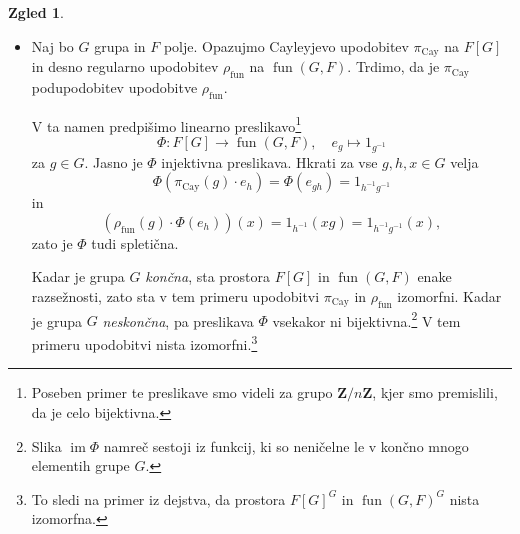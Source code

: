 \documentclass[11pt]{book}
\def\ZZ{\mathbf{Z}}
\def\11{\mathbf{1}}
\DeclareMathOperator\image{im}
\DeclareMathOperator\fun{fun}
\DeclareMathOperator\Cay{Cay}
\theoremstyle{definition}
\theoremstyle{zgled}
\newtheorem*{zgled}{Zgled}
\theoremstyle{odprtproblem}
\theoremstyle{domacanaloga}
\theoremstyle{izrek}
\begin{document}
\begin{zgled}
\begin{itemize}
    Torej za vsak $g \in G$ obstaja $\chi(g) \in F$, da je $\rho(g) \cdot v = \chi(g) v$. Na ta način dobimo funkcijo $\chi \colon G \to F$, se pravi element prostora $\fun(G,F)$. Ta funkcija ni čisto poljubna; ker je $\rho$ upodobitev, je $\chi$ nujno {\em homomorfizem} iz grupe $G$ v grupo $F^*$. Torej je $\chi$ pravzaprav upodobitev grupe $G$ na prostoru $F$ razsežnosti $1$.\footnote{Kadar je $\chi(g) = 1$ za vsak $g \in G$, je ta upodobitev izomorfna $\11$. Kadar je $\chi(g) \neq 1$ za vsaj kak $g \in G$, pa ta upodobitev \emph{ni} trivialna.} 
    
    Zdaj kot v zadnjem zgledu s predpisom
    \[
        \Phi \colon F \to V, \quad
        x \mapsto xv
    \]
    dobimo injektivno spletično med $\chi$ in $\rho$, torej lahko vidimo $\chi$ kot enorazsežno podupodobitev upodobitve $\rho$. Hkrati lahko iz te spletične obnovimo podatek o skupnem lastnem vektorju $v$ in upodobitvi $\chi$.\footnote{Namreč, $v = \Phi(1)$ in $\chi(g) = \rho(g) \cdot 1$.} 
    
    Torej smo vzpostavili bijektivno korespondenco med množico enorazsežnih podupodobitev upodobitve $\rho$ in skupnimi lastnimi vektorji vseh preslikav $\rho(g)$ za $g \in G$.

    Poseben primer te korespondence je zadnji zgled. Množico enorazsežnih trivialnih podupodobitev upodobitve $\rho$ lahko identificiramo z množico neničelnih spletičen $\hom_G(\11, V) \backslash \{ x \mapsto 0 \}$, ta pa ustreza skupnim lastnim vektorjem $\rho(g)$ za $g \in G$ z lastno vrednostjo $1$, kar je ravno množica $V^G \backslash \{ 0 \}$.

    \item Naj bo $G$ grupa in $F$ polje. Opazujmo Cayleyjevo upodobitev $\pi_{\Cay}$ na $F[G]$ in desno regularno upodobitev $\rho_{\fun}$ na $\fun(G,F)$. Trdimo, da je $\pi_{\Cay}$ podupodobitev upodobitve $\rho_{\fun}$.
    
    V ta namen predpišimo linearno preslikavo\footnote{Poseben primer te preslikave smo videli za grupo $\ZZ/n\ZZ$, kjer smo premislili, da je celo bijektivna.}
    \[
        \Phi \colon F[G] \to \fun(G,F), \quad
        e_g \mapsto 1_{g^{-1}}
    \]
    za $g \in G$. Jasno je $\Phi$ injektivna preslikava. Hkrati za vse $g,h,x \in G$ velja
    \[
        \Phi(\pi_{\Cay}(g) \cdot e_h) 
        = \Phi(e_{gh})
        = 1_{h^{-1} g^{-1}}
    \]
    in
    \[
        \left( \rho_{\fun}(g) \cdot \Phi(e_h) \right)(x)
        = 1_{h^{-1}}(xg)
        = 1_{h^{-1} g^{-1}}(x),
    \]
    zato je $\Phi$ tudi spletična.

    Kadar je grupa $G$ \emph{končna}, sta prostora $F[G]$ in $\fun(G,F)$ enake razsežnosti, zato sta v tem primeru upodobitvi $\pi_{\Cay}$ in $\rho_{\fun}$ izomorfni. Kadar je grupa $G$ \emph{neskončna}, pa preslikava $\Phi$ vsekakor ni bijektivna.\footnote{Slika $\image \Phi$ namreč sestoji iz funkcij, ki so neničelne le v končno mnogo elementih grupe $G$.} V tem primeru upodobitvi nista izomorfni.\footnote{To sledi na primer iz dejstva, da prostora $F[G]^G$ in $\fun(G,F)^G$ nista izomorfna.}
\end{itemize}
\end{zgled}
\end{document}
